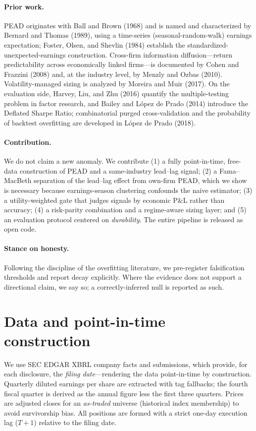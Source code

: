 \documentclass[11pt,a4paper]{article}
\theoremstyle{plain}
\theoremstyle{definition}
\begin{document}
\paragraph{Prior work.} PEAD originates with Ball and Brown (1968) and is named and characterized
by Bernard and Thomas (1989), using a time-series (seasonal-random-walk) earnings expectation;
Foster, Olsen, and Shevlin (1984) establish the standardized-unexpected-earnings construction.
Cross-firm information diffusion---return predictability across economically linked firms---is
documented by Cohen and Frazzini (2008) and, at the industry level, by Menzly and Ozbas (2010).
Volatility-managed sizing is analyzed by Moreira and Muir (2017). On the evaluation side, Harvey,
Liu, and Zhu (2016) quantify the multiple-testing problem in factor research, and Bailey and
L\'opez de Prado (2014) introduce the Deflated Sharpe Ratio; combinatorial purged cross-validation
and the probability of backtest overfitting are developed in L\'opez de Prado (2018).

\paragraph{Contribution.} We do not claim a new anomaly. We contribute (1) a fully point-in-time,
free-data construction of PEAD and a same-industry lead--lag signal; (2) a Fama--MacBeth separation
of the lead--lag effect from own-firm PEAD, which we show is necessary because earnings-season
clustering confounds the naive estimator; (3) a utility-weighted gate that judges signals by
economic P\&L rather than accuracy; (4) a risk-parity combination and a regime-aware sizing layer;
and (5) an evaluation protocol centered on \emph{durability}. The entire pipeline is released as
open code.

\paragraph{Stance on honesty.} Following the discipline of the overfitting literature, we
pre-register falsification thresholds and report decay explicitly. Where the evidence does not
support a directional claim, we say so; a correctly-inferred null is reported as such.

\section{Data and point-in-time construction}
\label{sec:data}

We use SEC EDGAR XBRL company facts and submissions, which provide, for each disclosure, the
\emph{filing date}---rendering the data point-in-time by construction. Quarterly diluted earnings
per share are extracted with tag fallbacks; the fourth fiscal quarter is derived as the annual
figure less the first three quarters. Prices are adjusted closes for an \emph{as-traded} universe
(historical index membership) to avoid survivorship bias. All positions are formed with a strict
one-day execution lag ($T{+}1$) relative to the filing date.
\end{document}
